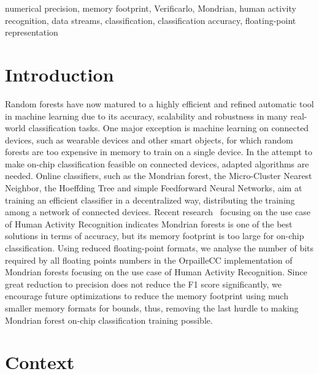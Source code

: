 \documentclass[conference]{IEEEtran}
\begin{document}
\begin{IEEEkeywords}
numerical precision, memory footprint, Verificarlo, Mondrian, human activity recognition, data streams, classification, classification accuracy, floating-point representation
\end{IEEEkeywords}

\section{Introduction}
Random forests have now matured to a highly efficient and refined automatic tool in machine learning due to its accuracy, scalability and robustness in many real-world classification tasks. One major exception is machine learning on connected devices, such as wearable devices and other smart objects, for which random forests are too expensive in memory to train on a single device. In the attempt to make on-chip classification feasible on connected devices, adapted algorithms are needed. Online classifiers, such as the Mondrian forest, the Micro-Cluster Nearest Neighbor, the Hoeffding Tree and simple Feedforward Neural Networks, aim at training an efficient classifier in a decentralized way, distributing the training among a network of connected devices. Recent research~\cite{khannouz2020benchmark} focusing on the use case of Human Activity Recognition indicates Mondrian forests is one of the best solutions in terms of accuracy, but its memory footprint is too large for on-chip classification. Using reduced floating-point formats, we analyse the number of bits required by all floating points numbers in the OrpailleCC implementation of Mondrian forests focusing on the use case of Human Activity Recognition. Since great reduction to precision does not reduce the F1 score significantly, we encourage future optimizations to reduce the memory footprint using much smaller memory formats for bounds, thus, removing the last hurdle to making Mondrian forest on-chip classification training possible.

\section{Context}
\end{document}
